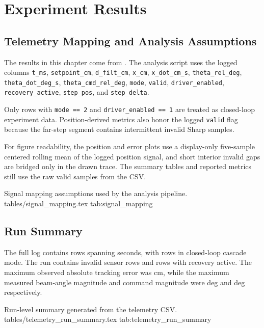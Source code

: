 \chapter{Experiment Results}

\section{Telemetry Mapping and Analysis Assumptions}

The results in this chapter come from
. The analysis script uses the
logged columns \verb|t_ms|, \verb|setpoint_cm|, \verb|d_filt_cm|, \verb|x_cm|,
\verb|x_dot_cm_s|, \verb|theta_rel_deg|, \verb|theta_dot_deg_s|,
\verb|theta_cmd_rel_deg|, \verb|mode|, \verb|valid|, \verb|driver_enabled|,
\verb|recovery_active|, \verb|step_pos|, and \verb|step_delta|.

Only rows with \verb|mode == 2| and \verb|driver_enabled == 1| are treated as
closed-loop experiment data. Position-derived metrics also honor the logged
\verb|valid| flag because the far-step segment contains intermittent invalid Sharp
samples.

For figure readability, the position and error plots use a display-only five-sample
centered rolling mean of the logged position signal, and short interior invalid gaps
are bridged only in the drawn trace. The summary tables and reported metrics still use
the raw valid samples from the CSV.

\ReportTableFromFile
  {Signal mapping assumptions used by the analysis pipeline.}
  {tables/signal_mapping.tex}
  {tab:signal_mapping}

\section{Run Summary}

The full log contains \TelemetryRowCount{} rows spanning \TelemetryDurationSeconds{}
seconds, with \TelemetryClosedLoopRowCount{} rows in closed-loop cascade mode. The run
contains \TelemetryInvalidRowCount{} invalid sensor rows and \TelemetryRecoveryRowCount{}
rows with recovery active. The maximum observed absolute tracking error was
\TelemetryMaxAbsErrorCm{} cm, while the maximum measured beam-angle magnitude and
command magnitude were \TelemetryMaxBeamAngleDeg{} deg and \TelemetryMaxCommandDeg{}
deg respectively.

\ReportTableFromFile
  {Run-level summary generated from the telemetry CSV.}
  {tables/telemetry_run_summary.tex}
  {tab:telemetry_run_summary}

